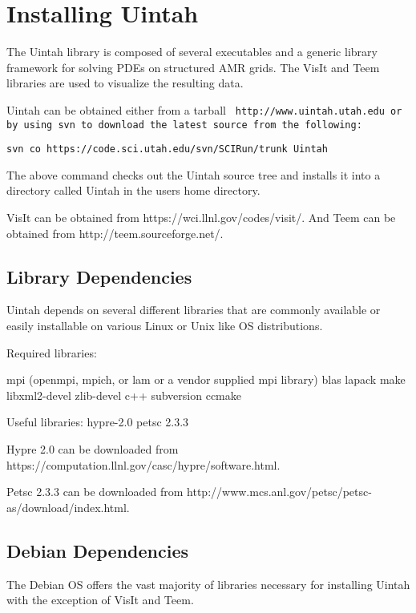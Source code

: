 \section{Installing Uintah} \label{Sec:installation}

The Uintah library is composed of several executables and a generic
library framework for solving PDEs on structured AMR grids.  The VisIt
and Teem libraries are used to visualize the resulting data.

Uintah can be obtained either from a tarball \tt
http://www.uintah.utah.edu \normalfont or by using svn to download the
latest source from the following:

\begin{Verbatim}[fontsize=\footnotesize]
  svn co https://code.sci.utah.edu/svn/SCIRun/trunk Uintah
\end{Verbatim}

The above command checks out the Uintah source tree and installs it
into a directory called Uintah in the users home directory.

VisIt can be obtained from https://wci.llnl.gov/codes/visit/. And Teem
can be obtained from http://teem.sourceforge.net/.

\subsection{Library Dependencies}

Uintah depends on several different libraries that are commonly
available or easily installable on various Linux or Unix like OS
distributions.  

Required libraries:

mpi (openmpi, mpich, or lam or a vendor supplied mpi library)
blas
lapack
make
libxml2-devel
zlib-devel
c++
subversion
ccmake

Useful libraries:
hypre-2.0
petsc 2.3.3

Hypre 2.0 can be downloaded from
https://computation.llnl.gov/casc/hypre/software.html.

Petsc 2.3.3 can be downloaded from
http://www.mcs.anl.gov/petsc/petsc-as/download/index.html.

\subsection{Debian Dependencies}

The Debian OS offers the vast majority of libraries necessary for
installing Uintah with the exception of VisIt and Teem.

